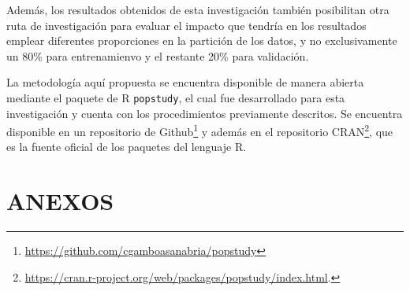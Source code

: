 \documentclass[
]{article}
\begin{document}
Además, los resultados obtenidos de esta investigación también
posibilitan otra ruta de investigación para evaluar el impacto que
tendría en los resultados emplear diferentes proporciones en la
partición de los datos, y no exclusivamente un 80\% para entrenamienvo y
el restante 20\% para validación.

La metodología aquí propuesta se encuentra disponible de manera abierta
mediante el paquete de R \texttt{popstudy}, el cual fue desarrollado
para esta investigación y cuenta con los procedimientos previamente
descritos. Se encuentra disponible en un repositorio de
Github\footnote{\url{https://github.com/cgamboasanabria/popstudy}} y
además en el repositorio CRAN\footnote{\url{https://cran.r-project.org/web/packages/popstudy/index.html}.},
que es la fuente oficial de los paquetes del lenguaje R.

\newpage

\section{ANEXOS}


\label{chap:anexos}
\begin{table}[!h]

\caption{\label{tab:unnamed-chunk-40}\label{tab:tiempos_estimacion}Tiempos de estimación en minutos para cada modelo según su tipo de estimación.}
\centering
{}
\end{table}
\end{document}

